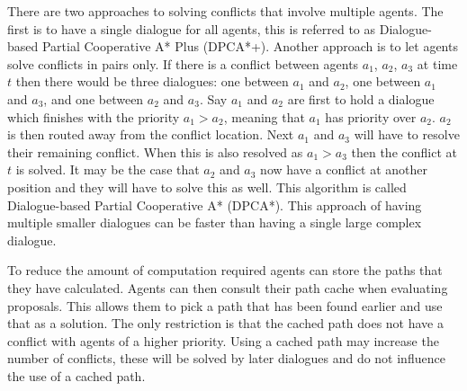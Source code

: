 There are two approaches to solving conflicts that involve multiple agents. The
first is to have a single dialogue for all agents, this is referred to as
Dialogue-based Partial Cooperative A* Plus (DPCA*+). Another approach is to let
agents solve conflicts in pairs only. If there is a conflict between agents
$a_1$, $a_2$, $a_3$ at time $t$ then there would be three dialogues: one
between $a_1$ and $a_2$, one between $a_1$ and $a_3$, and one between $a_2$ and
$a_3$. Say $a_1$ and $a_2$ are first to hold a dialogue which finishes with the
priority $a_1 > a_2$, meaning that $a_1$ has priority over $a_2$. $a_2$ is then
routed away from the conflict location. Next $a_1$ and $a_3$ will have to
resolve their remaining conflict. When this is also resolved as $a_1 > a_3$
then the conflict at $t$ is solved. It may be the case that $a_2$ and $a_3$ now
have a conflict at another position and they will have to solve this as well.
This algorithm is called Dialogue-based Partial Cooperative A* (DPCA*). This
approach of having multiple smaller dialogues can be faster than having a
single large complex dialogue.

To reduce the amount of computation required agents can store the paths that
they have calculated. Agents can then consult their path cache when evaluating
proposals. This allows them to pick a path that has been found earlier and use
that as a solution. The only restriction is that the cached path does not have
a conflict with agents of a higher priority. Using a cached path may increase
the number of conflicts, these will be solved by later dialogues and do not
influence the use of a cached path.

